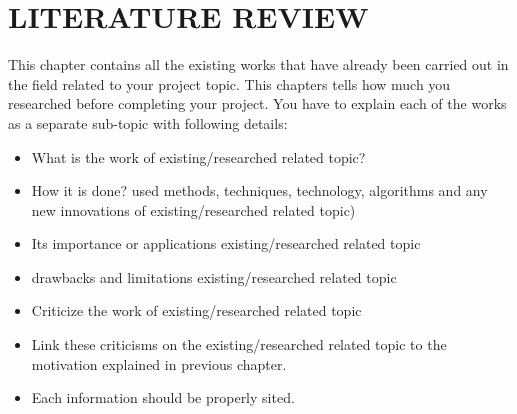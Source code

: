 \newpage
\section{LITERATURE REVIEW}

This chapter contains all the existing works that have already been carried out in
the field related to your project topic. This chapters tells how much you
researched before completing your project. You have to explain each of the
works as a separate sub-topic with following details:

\begin{itemize}
    \item What is the work of existing/researched related topic?
    \item How it is done? used methods, techniques, technology, algorithms and any new innovations of existing/researched related topic)
    \item Its importance or applications existing/researched related topic
    \item drawbacks and limitations existing/researched related topic
    \item Criticize the work of existing/researched related topic
    \item Link these criticisms on the existing/researched related topic to the motivation explained in previous chapter.
    \item Each information should be properly sited.
\end{itemize}
